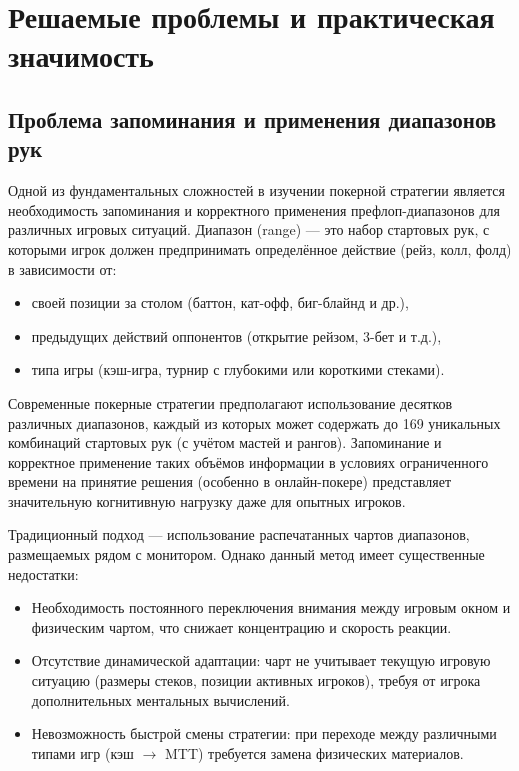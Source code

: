\section{Решаемые проблемы и практическая значимость}

\subsection{Проблема запоминания и применения диапазонов рук}
Одной из фундаментальных сложностей в изучении покерной стратегии является необходимость запоминания и корректного применения префлоп-диапазонов для различных игровых ситуаций. Диапазон (range) --- это набор стартовых рук, с которыми игрок должен предпринимать определённое действие (рейз, колл, фолд) в зависимости от:

\begin{itemize}
    \item своей позиции за столом (баттон, кат-офф, биг-блайнд и др.),
    \item предыдущих действий оппонентов (открытие рейзом, 3-бет и т.д.),
    \item типа игры (кэш-игра, турнир с глубокими или короткими стеками).
\end{itemize}

Современные покерные стратегии предполагают использование десятков различных диапазонов, каждый из которых может содержать до 169 уникальных комбинаций стартовых рук (с учётом мастей и рангов). Запоминание и корректное применение таких объёмов информации в условиях ограниченного времени на принятие решения (особенно в онлайн-покере) представляет значительную когнитивную нагрузку даже для опытных игроков.

Традиционный подход --- использование распечатанных чартов диапазонов, размещаемых рядом с монитором. Однако данный метод имеет существенные недостатки:

\begin{itemize}
    \item Необходимость постоянного переключения внимания между игровым окном и физическим чартом, что снижает концентрацию и скорость реакции.
    
    \item Отсутствие динамической адаптации: чарт не учитывает текущую игровую ситуацию (размеры стеков, позиции активных игроков), требуя от игрока дополнительных ментальных вычислений.
    
    \item Невозможность быстрой смены стратегии: при переходе между различными типами игр (кэш $\rightarrow$ MTT) требуется замена физических материалов.
\end{itemize}

